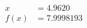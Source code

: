 \documentclass[preview]{standalone}
\begin{document}
\begin{align*}
x &= 4.9620\\f(x) &= 7.9998193
\end{align*}
\end{document}
